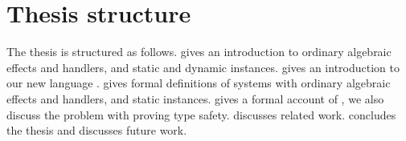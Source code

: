\section*{Thesis structure}
The thesis is structured as follows.
 gives an introduction to ordinary algebraic effects and handlers, and static and dynamic instances.
 gives an introduction to our new language \lang{}.
 gives formal definitions of systems with ordinary algebraic effects and handlers, and static instances.
 gives a formal account of \lang{}, we also discuss the problem with proving type safety.
 discusses related work.
 concludes the thesis and discusses future work.

